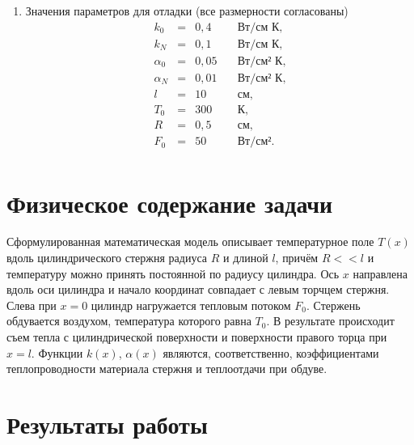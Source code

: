\documentclass[a4paper,oneside,12pt]{extreport}
\begin{document}
\begin{enumerate}
	\item Значения параметров для отладки (все размерности согласованы)
	\begin{equation*}
		\begin{array}{rlll}
			k_0      &=& 0,4  &\quad\text{Вт/см К},\\
			k_N      &=& 0,1  &\quad\text{Вт/см К},\\
			\alpha_0 &=& 0,05 &\quad\text{Вт/см² К},\\
			\alpha_N &=& 0,01 &\quad\text{Вт/см² К},\\
			l        &=& 10   &\quad\text{см},\\
			T_0      &=& 300  &\quad\text{К},\\
			R        &=& 0,5  &\quad\text{см},\\
			F_0      &=& 50   &\quad\text{Вт/см²}.\\
		\end{array}
	\end{equation*}
\end{enumerate}

\section*{Физическое содержание задачи}

Сформулированная математическая модель описывает температурное поле $T(x)$ вдоль цилиндрического стержня радиуса $R$ и длиной $l$, причём $R<<l$ и температуру можно принять постоянной по радиусу цилиндра.
Ось $x$ направлена вдоль оси цилиндра и начало координат совпадает с левым торчцем стержня.
Слева при $x=0$ цилиндр нагружается тепловым потоком $F_0$.
Стержень обдувается воздухом, температура которого равна $T_0$.
В результате происходит съем тепла с цилиндрической поверхности и поверхности правого торца при $x=l$.
Функции $k(x)$, $\alpha(x)$ являются, соответственно, коэффициентами теплопроводности материала стержня и теплоотдачи при обдуве.

\section*{Результаты работы}
\end{document}
